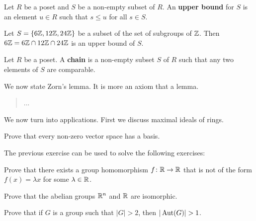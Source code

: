 \begin{definition}
    Let $R$ be a poset and $S$ be a non-empty subset of $R$. An \textbf{upper bound}
    for $S$ is an element $u\in R$ such that $s\leq u$ for all $s\in S$. 
\end{definition}

\begin{example}
    Let $S=\{6\mathbb{Z},12\mathbb{Z},24\mathbb{Z}\}$ be a subset of the set of subgroups of $\mathbb{Z}$. Then 
    $6\mathbb{Z}=6\mathbb{Z}\cap 12\mathbb{Z}\cap 24\mathbb{Z}$ is an upper bound of $S$. 
\end{example}

\begin{definition}
    Let $R$ be a poset. A \textbf{chain} is a non-empty subset $S$ of $R$ such that
    any two elements of $S$ are comparable. 
\end{definition}

We now state Zorn's lemma. It is more an axiom that a lemma.

\begin{quote}
    ...
\end{quote}

We now turn into applications. First we discuss maximal ideals of rings. 

\begin{exercise}
Prove that every non-zero vector space has a basis.
\end{exercise}

The previous exercise can be used to solve the following exercises:

\begin{exercise}
    Prove that there exists a group homomorphism $f\colon\mathbb{R}\to\mathbb{R}$ that 
    is not of the form $f(x)=\lambda x$ for some $\lambda\in\mathbb{R}$. 
\end{exercise}

\begin{exercise}
    Prove that the abelian groups $\mathbb{R}^n$ and $\mathbb{R}$ are isomorphic.
\end{exercise}

\begin{exercise}
    Prove that if $G$ is a group such that $|G|>2$, then $|\Aut(G)|>1$.
\end{exercise}
